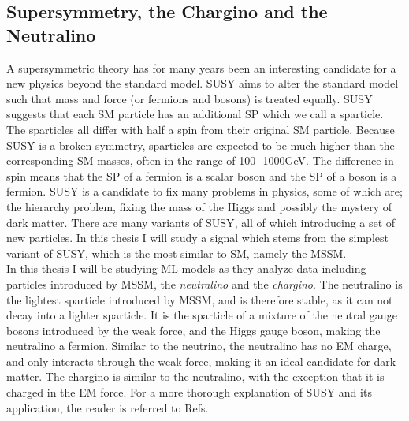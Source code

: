 \subsection{Supersymmetry, the Chargino and the Neutralino}\label{subsec:SS}
A supersymmetric theory has for many years been an interesting candidate for a new physics beyond the standard 
model. \ac{SUSY} aims to alter the standard model such that mass and force (or fermions and bosons) is treated equally. 
\ac{SUSY} suggests that each \ac{SM} particle has an additional \ac{SP} which we call a sparticle. 
The sparticles all differ with half a spin from their original \ac{SM} particle. Because \ac{SUSY} is a broken symmetry, 
sparticles are expected to be much higher than the corresponding \ac{SM} masses, often in the range of 100- 1000GeV. 
The difference in spin means that the \ac{SP} of a fermion is a scalar boson and the \ac{SP} of a boson is a fermion. \ac{SUSY} is a 
candidate to fix many problems in physics, some of which are; the hierarchy problem, fixing the mass of the Higgs 
and possibly the mystery of dark matter. There are many variants of \ac{SUSY}, all of which introducing a set of new 
particles. In this thesis I will study a signal which stems from the simplest variant of \ac{SUSY}, which is the most 
similar to \ac{SM}, namely the \ac{MSSM}. 
\\
In this thesis I will be studying \ac{ML} models as they analyze data including particles introduced by \ac{MSSM}, the \emph{neutralino} and 
the \emph{chargino}. The neutralino is the lightest sparticle introduced by \ac{MSSM}, and is therefore stable, as it can not decay into a lighter sparticle. 
It is the sparticle of a mixture of the neutral gauge bosons introduced by the weak force, and the Higgs gauge boson, making the neutralino a 
fermion. Similar to the neutrino, the neutralino has no \ac{EM} charge, and only interacts through the weak force, making it an ideal candidate 
for dark matter. The chargino is similar to the neutralino, with the exception that it is charged in the \ac{EM} force. 
For a more thorough explanation of \ac{SUSY} and its application, the reader is referred to Refs.\cite{SUSY}. 